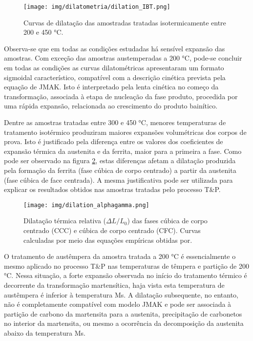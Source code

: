 \begin{figure}
	\texttt{[image: img/dilatometria/dilation\_IBT.png]}
	\caption{Curvas de dilatação das amostradas tratadas isotermicamente entre 200 e 450 °C.}
	\label{fig:IBT}
\end{figure}

Observa-se que em todas as condições estudadas há sensível expansão das amostras. Com exceção das amostras austemperadas a 200 °C, pode-se concluir em todas as condições as curvas dilatométricas apresentaram um formato sigmoidal característico, compatível com a descrição cinética prevista pela equação de JMAK. Isto é interpretado pela lenta cinética no começo da transformação, associada à etapa de nucleação da fase produto, procedida por uma rápida expansão, relacionada ao crescimento do produto bainítico.

Dentre as amostras tratadas entre 300 e 450 °C, menores temperaturas de tratamento isotérmico produziram maiores expansões volumétricas dos corpos de prova. Isto é justificado pela diferença entre os valores dos coeficientes de expansão térmica da austenita e da ferrita, maior para a primeira a fase. Como pode ser observado na figura \ref{fig:dilRel}, estas diferenças afetam a dilatação produzida pela formação da ferrita (fase cúbica de corpo centrado) a partir da austenita (fase cúbica de face centrada). A mesma justificativa pode ser utilizada para explicar os resultados obtidos nas amostras tratadas pelo processo T\&P.

\begin{figure}
	\texttt{[image: img/dilation\_alphagamma.png]}
	\caption{Dilatação térmica relativa ($\Delta L/L_0$) das fases cúbica de corpo centrado (CCC) e cúbica de corpo centrado (CFC). Curvas calculadas por meio das equações empíricas obtidas por\cite{VanBohemen2013b}.}
	\label{fig:dilRel}
\end{figure}

O tratamento de austêmpera da amostra tratada a 200 °C é essencialmente o mesmo aplicado no processo T\&P nas temperaturas de têmpera e partição de 200 °C. Nessa situação, a forte expansão observada no início do tratamento térmico é decorrente da transformação martensítica, haja vista esta temperatura de austêmpera é inferior à temperatura Ms. A dilatação subsequente, no entanto, não é completamente compatível com modelo JMAK e pode ser associada à partição de carbono da martensita para a austenita, precipitação de carbonetos no interior da martensita, ou mesmo a ocorrência da decomposição da austenita abaixo da temperatura Ms.

